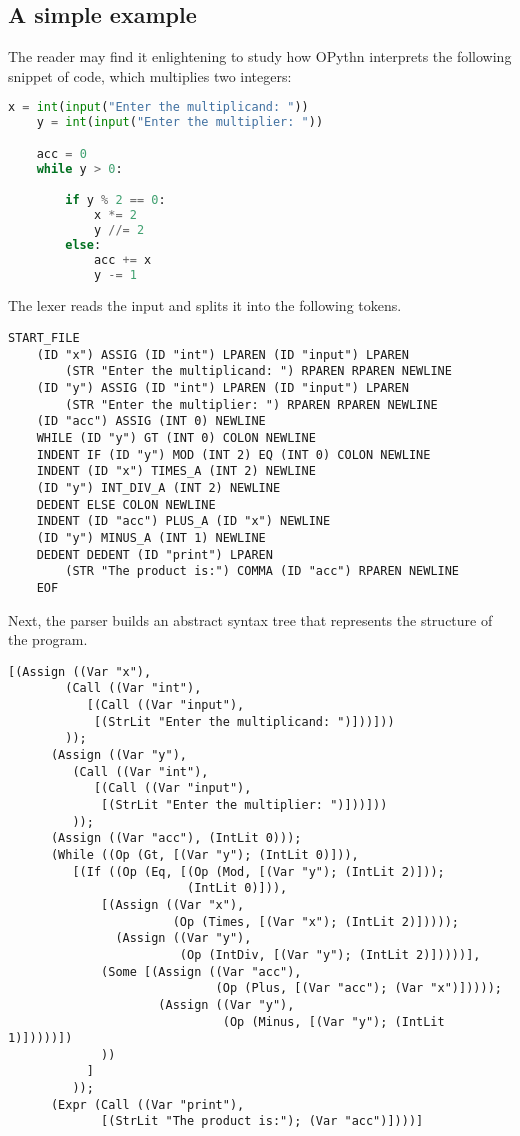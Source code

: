 \documentclass[11pt, twoside]{article}
\begin{document}
    \subsection{A simple example}
    The reader may find it enlightening to study how OPythn interprets the following snippet of code, which multiplies two integers:
    \begin{lstlisting}[language=python]
    x = int(input("Enter the multiplicand: "))
    y = int(input("Enter the multiplier: "))

    acc = 0
    while y > 0:

        if y % 2 == 0:
            x *= 2
            y //= 2
        else:
            acc += x
            y -= 1
    \end{lstlisting}
    The lexer reads the input and splits it into the following tokens.
    \begin{lstlisting}[language=caml]
    START_FILE
    (ID "x") ASSIG (ID "int") LPAREN (ID "input") LPAREN
        (STR "Enter the multiplicand: ") RPAREN RPAREN NEWLINE
    (ID "y") ASSIG (ID "int") LPAREN (ID "input") LPAREN
        (STR "Enter the multiplier: ") RPAREN RPAREN NEWLINE
    (ID "acc") ASSIG (INT 0) NEWLINE
    WHILE (ID "y") GT (INT 0) COLON NEWLINE
    INDENT IF (ID "y") MOD (INT 2) EQ (INT 0) COLON NEWLINE
    INDENT (ID "x") TIMES_A (INT 2) NEWLINE
    (ID "y") INT_DIV_A (INT 2) NEWLINE
    DEDENT ELSE COLON NEWLINE
    INDENT (ID "acc") PLUS_A (ID "x") NEWLINE
    (ID "y") MINUS_A (INT 1) NEWLINE
    DEDENT DEDENT (ID "print") LPAREN
        (STR "The product is:") COMMA (ID "acc") RPAREN NEWLINE
    EOF
    \end{lstlisting}
    Next, the parser builds an abstract syntax tree that represents the structure of the program.
    \begin{lstlisting}[language=caml]
    [(Assign ((Var "x"),
        (Call ((Var "int"),
           [(Call ((Var "input"),
            [(StrLit "Enter the multiplicand: ")]))]))
        ));
      (Assign ((Var "y"),
         (Call ((Var "int"),
            [(Call ((Var "input"),
             [(StrLit "Enter the multiplier: ")]))]))
         ));
      (Assign ((Var "acc"), (IntLit 0)));
      (While ((Op (Gt, [(Var "y"); (IntLit 0)])),
         [(If ((Op (Eq, [(Op (Mod, [(Var "y"); (IntLit 2)]));
                         (IntLit 0)])),
             [(Assign ((Var "x"),
                       (Op (Times, [(Var "x"); (IntLit 2)]))));
               (Assign ((Var "y"),
                        (Op (IntDiv, [(Var "y"); (IntLit 2)]))))],
             (Some [(Assign ((Var "acc"),
                             (Op (Plus, [(Var "acc"); (Var "x")]))));
                     (Assign ((Var "y"),
                              (Op (Minus, [(Var "y"); (IntLit 1)]))))])
             ))
           ]
         ));
      (Expr (Call ((Var "print"),
             [(StrLit "The product is:"); (Var "acc")])))]
    \end{lstlisting}
\end{document}
